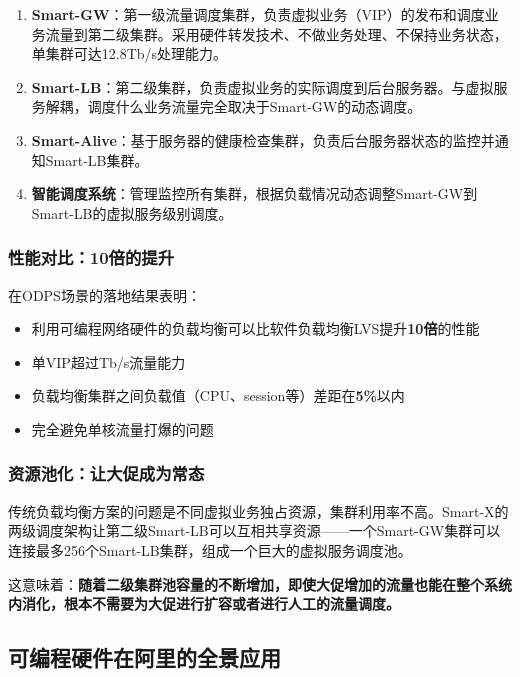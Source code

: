 \begin{enumerate}
    \item \textbf{Smart-GW}：第一级流量调度集群，负责虚拟业务（VIP）的发布和调度业务流量到第二级集群。采用硬件转发技术、不做业务处理、不保持业务状态，单集群可达12.8Tb/s处理能力。
    
    \item \textbf{Smart-LB}：第二级集群，负责虚拟业务的实际调度到后台服务器。与虚拟服务解耦，调度什么业务流量完全取决于Smart-GW的动态调度。
    
    \item \textbf{Smart-Alive}：基于服务器的健康检查集群，负责后台服务器状态的监控并通知Smart-LB集群。
    
    \item \textbf{智能调度系统}：管理监控所有集群，根据负载情况动态调整Smart-GW到Smart-LB的虚拟服务级别调度。
\end{enumerate}

\subsubsection{性能对比：10倍的提升}

在ODPS场景的落地结果表明：
\begin{itemize}
    \item 利用可编程网络硬件的负载均衡可以比软件负载均衡LVS提升\textbf{10倍}的性能
    \item 单VIP超过Tb/s流量能力
    \item 负载均衡集群之间负载值（CPU、session等）差距在\textbf{5\%}以内
    \item 完全避免单核流量打爆的问题
\end{itemize}

\subsubsection{资源池化：让大促成为常态}

传统负载均衡方案的问题是不同虚拟业务独占资源，集群利用率不高。Smart-X的两级调度架构让第二级Smart-LB可以互相共享资源——一个Smart-GW集群可以连接最多256个Smart-LB集群，组成一个巨大的虚拟服务调度池。

这意味着：\textbf{随着二级集群池容量的不断增加，即使大促增加的流量也能在整个系统内消化，根本不需要为大促进行扩容或者进行人工的流量调度。}

\subsection{可编程硬件在阿里的全景应用}

